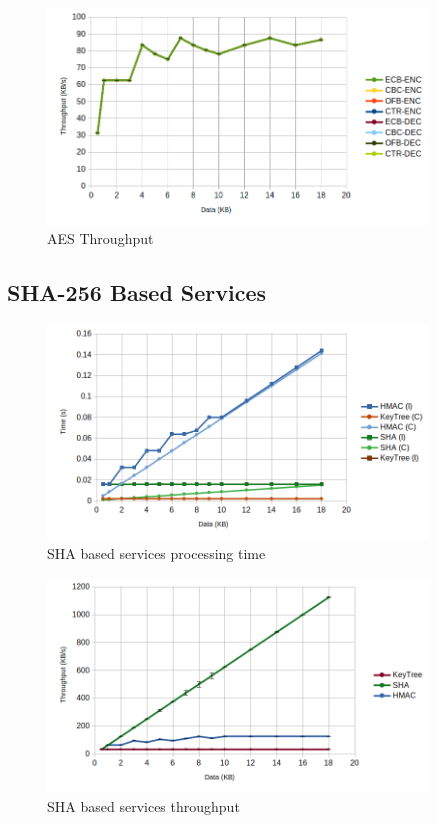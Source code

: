 \begin{figure}[h!]
	\centering
	\includegraphics[width=0.9\textwidth]{./Images/aes128-tput.png}
	\caption{AES Throughput}
	\label{fig:performance:aes-tput}
\end{figure}

\subsection{SHA-256 Based Services}\label{chap:evaluation:cores:sha}

\begin{figure}[h!]
	\centering
	\includegraphics[width=0.9\textwidth]{./Images/sha-compare.png}
	\caption{SHA based services processing time}
	\label{fig:performance:sha-compare}
\end{figure}

\begin{figure}[h!]
	\centering
	\includegraphics[width=0.9\textwidth]{./Images/sha-tput.png}
	\caption{SHA based services throughput}
	\label{fig:performance:sha-tput}
\end{figure}

